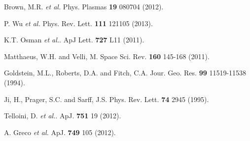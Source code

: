 \documentclass[aps,prl,amsmath,amssymb,reprint,superscriptaddress]{revtex4-1} %
\begin{document}
\begin{thebibliography}{99}
Brown, M.R. {\it et al.} Phys. Plasmas {\bf 19} 080704 (2012).

P. Wu {\it et al.} Phys. Rev. Lett. {\bf 111} 121105 (2013).

K.T. Osman {\it et al.}. ApJ Lett. {\bf 727} L11 (2011).

Matthaeus, W.H. and Velli, M. Space Sci. Rev. {\bf 160} 145-168 (2011).

Goldstein, M.L., Roberts, D.A. and Fitch, C.A. Jour. Geo. Res. {\bf 99} 11519-11538 (1994).

Ji, H., Prager, S.C. and Sarff, J.S. Phys. Rev. Lett. {\bf 74} 2945 (1995).

Telloini, D. {\it et al.}. ApJ. {\bf 751} 19 (2012).


A. Greco {\it et al.} ApJ. {\bf 749} 105 (2012).

\end{thebibliography}
\end{document}

